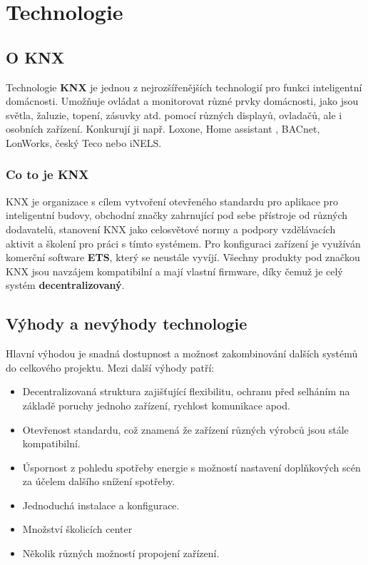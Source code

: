 \documentclass[12pt, a4paper,
twoside,        %
openright
]{report}
\begin{document}


\chapter{Technologie}

\section{O KNX}
\label{sec:uvod}

Technologie \textbf {KNX} \cite{KNX} je jednou z nejrozšířenějších technologií pro funkci inteligentní domácnosti. Umožňuje ovládat a monitorovat různé prvky domácnosti, jako jsou světla, žaluzie, topení, zásuvky atd. pomocí různých displayů, ovladačů, ale i osobních zařízení. Konkurují ji např. Loxone\cite{Loxone}, Home assistant \cite{HA}, BACnet\cite{BAC}, LonWorks\cite{LW}, český Teco\cite{Teco} nebo iNELS\cite{INELS}.
\subsection{Co to je KNX}
KNX je organizace s cílem vytvoření otevřeného standardu pro aplikace pro inteligentní budovy, obchodní značky zahrnující pod sebe přístroje od různých dodavatelů, stanovení KNX jako celosvětové normy a podpory vzdělávacích aktivit a školení pro práci s tímto systémem. Pro konfiguraci zařízení je využíván komerční software \textbf {ETS}, který se neustále vyvíjí.  Všechny produkty pod značkou KNX jsou navzájem kompatibilní a mají vlastní firmware, díky čemuž je celý systém \textbf {decentralizovaný}.


\section{Výhody a nevýhody technologie}
Hlavní výhodou je snadná dostupnost a možnost zakombinování dalších systémů do celkového projektu. Mezi další výhody patří: 

\begin{itemize}
	\item Decentralizovaná struktura zajišťující flexibilitu, ochranu před selháním na základě poruchy jednoho zařízení, rychlost komunikace apod.
	\item Otevřenost standardu, což znamená že zařízení různých výrobců jsou stále kompatibilní.
	\item Úspornost z pohledu spotřeby energie s možností nastavení doplňkových scén za účelem dalšího snížení spotřeby.
	\item Jednoduchá instalace a konfigurace.
	\item Množství školicích center
	\item Několik různých možností propojení zařízení.
\end{itemize}
\end{document}
